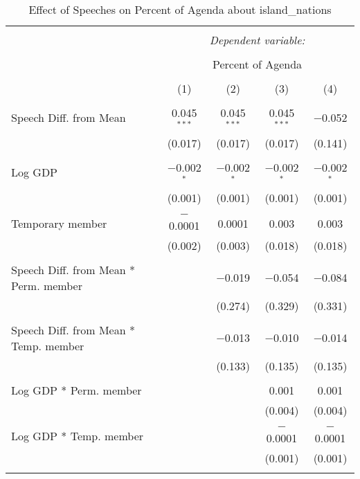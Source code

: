 
\begin{table}[!htbp] \centering 
  \caption{Effect of Speeches on Percent of Agenda about island_nations} 
  \label{} 
\begin{tabular}{@{\extracolsep{5pt}}lcccc} 
\\[-1.8ex]\hline 
\hline \\[-1.8ex] 
 & \multicolumn{4}{c}{\textit{Dependent variable:}} \\ 
\cline{2-5} 
\\[-1.8ex] & \multicolumn{4}{c}{Percent of Agenda} \\ 
\\[-1.8ex] & (1) & (2) & (3) & (4)\\ 
\hline \\[-1.8ex] 
 Speech Diff. from Mean & 0.045$^{***}$ & 0.045$^{***}$ & 0.045$^{***}$ & $-$0.052 \\ 
  & (0.017) & (0.017) & (0.017) & (0.141) \\ 
  & & & & \\ 
 Log GDP & $-$0.002$^{*}$ & $-$0.002$^{*}$ & $-$0.002$^{*}$ & $-$0.002$^{*}$ \\ 
  & (0.001) & (0.001) & (0.001) & (0.001) \\ 
  & & & & \\ 
 Temporary member & $-$0.0001 & 0.0001 & 0.003 & 0.003 \\ 
  & (0.002) & (0.003) & (0.018) & (0.018) \\ 
  & & & & \\ 
 Speech Diff. from Mean * Perm. member &  & $-$0.019 & $-$0.054 & $-$0.084 \\ 
  &  & (0.274) & (0.329) & (0.331) \\ 
  & & & & \\ 
 Speech Diff. from Mean * Temp. member &  & $-$0.013 & $-$0.010 & $-$0.014 \\ 
  &  & (0.133) & (0.135) & (0.135) \\ 
  & & & & \\ 
 Log GDP * Perm. member &  &  & 0.001 & 0.001 \\ 
  &  &  & (0.004) & (0.004) \\ 
  & & & & \\ 
 Log GDP * Temp. member &  &  & $-$0.0001 & $-$0.0001 \\ 
  &  &  & (0.001) & (0.001) \\ 
  & & & & \\ 

\end{tabular}
\end{table}
